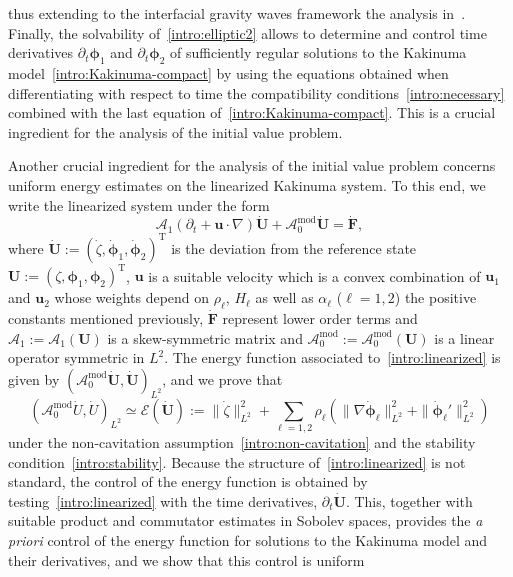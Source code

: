 \documentclass[11pt,leqno]{article}
\numberwithin{equation}{section}
\numberwithin{figure}{section}
\begin{document}
thus extending to the interfacial gravity waves framework the analysis in~\cite{DucheneIguchi2019-1}.
Finally, the solvability of~\eqref{intro:elliptic2} allows to determine and control time derivatives 
$\partial_t{\bm \phi}_1 $ and $\partial_t{\bm \phi}_2 $ of sufficiently regular solutions to the Kakinuma model~\eqref{intro:Kakinuma-compact} by using the equations obtained when differentiating with respect to time the compatibility conditions~\eqref{intro:necessary} combined with the last equation of~\eqref{intro:Kakinuma-compact}. This is a crucial ingredient for the analysis of the initial value problem. 

Another crucial ingredient for the analysis of the initial value problem concerns uniform energy estimates on the linearized Kakinuma system. To this end, we write the linearized system under the form
%
\begin{equation}\label{intro:linearized}
	\mathscr{A}_1(\partial_t+\bm{u}\cdot\nabla)\dot{\bm{U}} + \mathscr{A}_0^\mathrm{mod}\dot{\bm{U}} = \dot{\bm{F}},
\end{equation}
%
where $\dot{\bm{U}}:=(\dot{\zeta}, \dot{\bm{\phi}}_1, \dot{\bm{\phi}}_2)^\mathrm{T}$ is the deviation from the reference state $\bm{U}:=({\zeta}, {\bm{\phi}}_1, {\bm{\phi}}_2)^\mathrm{T}$, $\bm{u}$ is a suitable velocity which is a convex combination of  $\bm{u}_1$ and $\bm{u}_2$ whose weights depend on $\rho_\ell$, $H_\ell$ as well as $\alpha_\ell$ ($\ell=1,2$) the positive constants mentioned previously,  $\dot{\bm{F}}$ represent lower order terms and 
 $\mathscr{A}_1:=\mathscr{A}_1(\bm{U})$ is a skew-symmetric matrix and $\mathscr{A}_0^\mathrm{mod}:=\mathscr{A}_0^\mathrm{mod}(\bm{U})$ is a linear operator symmetric in $L^2$. 
The energy function associated to~\eqref{intro:linearized} is given by 
$(\mathscr{A}_0^\mathrm{mod}\dot{\bm{U}},\dot{\bm{U}})_{L^2}$, and we prove that
%
\[(\mathscr{A}_0^\mathrm{mod}\dot{U},\dot{U})_{L^2} \simeq \mathscr{E}(\dot{\bm{U}})
	:= \|\dot{\zeta}\|_{L^2}^2
	+ \sum_{\ell=1,2}\rho_\ell( \|\nabla\dot{\bm{\phi}}_\ell\|_{L^2}^2
	+ \|\dot{\bm{\phi}}_\ell'\|_{L^2}^2 )
\]
%
under the non-cavitation assumption~\eqref{intro:non-cavitation} and the stability condition~\eqref{intro:stability}. 
Because the structure of~\eqref{intro:linearized} is not standard, the control of the energy function is obtained 
by testing~\eqref{intro:linearized} with the time derivatives, $\partial_t\dot{\bm{U}}$.
This, together with suitable product and commutator estimates in Sobolev spaces, provides the {\em a priori} control of 
the energy function for solutions to the Kakinuma model and their derivatives, and we show that this control is uniform
\end{document}
